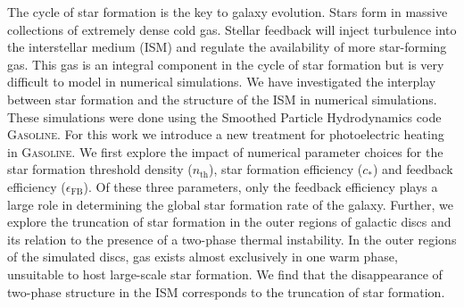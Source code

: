 The cycle of star formation is the key to galaxy evolution.  Stars form in massive collections of extremely dense cold gas.  Stellar feedback will inject turbulence into the interstellar medium (ISM) and regulate the availability of more star-forming gas.  This gas is an integral component in the cycle of star formation but is very difficult to model in numerical simulations.  We have investigated the interplay between star formation and the structure of the ISM in numerical simulations.  These simulations were done using the Smoothed Particle Hydrodynamics code \textsc{Gasoline}.  For this work we introduce a new treatment for photoelectric heating in \textsc{Gasoline}.  We first explore the impact of numerical parameter choices for the star formation threshold density ($n_{\text{th}}$), star formation efficiency ($c_*$) and feedback efficiency ($\epsilon_{\text{FB}}$).  Of these three parameters, only the feedback efficiency plays a large role in determining the global star formation rate of the galaxy.  Further, we explore the truncation of star formation in the outer regions of galactic discs and its relation to the presence of a two-phase thermal instability.  In the outer regions of the simulated discs, gas exists almost exclusively in one warm phase, unsuitable to host large-scale star formation.  We find that the disappearance of two-phase structure in the ISM corresponds to the truncation of star formation.


%
%
%
%
%
%
%
%
%
%
%
%
%
%
%
%


